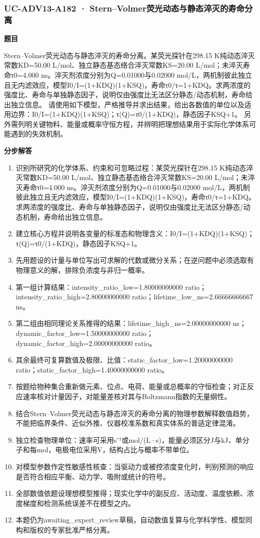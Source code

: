 \documentclass[UTF8,11pt,a4paper]{ctexart}
\begin{document}
\subsubsection*{UC-ADV13-A182 · Stern–Volmer荧光动态与静态淬灭的寿命分离}
\noindent\textbf{题目}\par
Stern–Volmer荧光动态与静态淬灭的寿命分离。某荧光探针在298.15 K纯动态淬灭常数KD=50.00 L/mol、独立静态基态络合淬灭常数KS=20.00 L/mol；未淬灭寿命τ0=4.000 ns。淬灭剂浓度分别为Q=0.01000与0.02000 mol/L，两机制彼此独立且无内滤效应，模型I0/I=(1+KDQ)(1+KSQ)，寿命τ0/τ=1+KDQ。求两浓度的强度比、寿命与单独静态因子，说明仅由强度比无法区分静态/动态机制，寿命给出独立信息。 请使用如下模型，严格推导并求出结果，给出各数值的单位以及适用边界：I0/I=(1+KDQ)(1+KSQ)；τ(Q)=τ0/(1+KDQ)，静态因子KSQ+1。 另外需列明关键物料、能量或概率守恒方程，并辨明把理想结果用于实际化学体系可能遇到的失效机制。\par
\medskip\noindent\textbf{分步解答}
\begin{enumerate}
\item 识别所研究的化学体系、约束和可忽略过程：某荧光探针在298.15 K纯动态淬灭常数KD=50.00 L/mol、独立静态基态络合淬灭常数KS=20.00 L/mol；未淬灭寿命τ0=4.000 ns。淬灭剂浓度分别为Q=0.01000与0.02000 mol/L，两机制彼此独立且无内滤效应，模型I0/I=(1+KDQ)(1+KSQ)，寿命τ0/τ=1+KDQ。求两浓度的强度比、寿命与单独静态因子，说明仅由强度比无法区分静态/动态机制，寿命给出独立信息。
\item 建立核心方程并说明各变量的标准态和物理含义：I0/I=(1+KDQ)(1+KSQ)；τ(Q)=τ0/(1+KDQ)，静态因子KSQ+1。
\item 先用题设的计量与单位写出可求解的代数或微分关系；在逆问题中必须选取有物理意义的解，排除负浓度与非归一概率。
\item 第一组计算结果：intensity\_ratio\_low=1.80000000000 ratio；intensity\_ratio\_high=2.80000000000 ratio；lifetime\_low\_ns=2.66666666667 ns。
\item 第二组由相同理论关系推得的结果：lifetime\_high\_ns=2.00000000000 ns；dynamic\_factor\_low=1.50000000000 ratio；dynamic\_factor\_high=2.00000000000 ratio。
\item 其余最终可复算数值及极限、比值：static\_factor\_low=1.20000000000 ratio；static\_factor\_high=1.40000000000 ratio。
\item 按题给物种集合重新做元素、位点、电荷、能量或总概率的守恒检查；对正反应速率核对计量因子，对能量差核对其与Boltzmann指数的无量纲性。
\item 结合Stern–Volmer荧光动态与静态淬灭的寿命分离的物理参数解释数值趋势，不能把临界条件、近似外推、仪器校准系数和真实体系的普适定律混淆。
\item 独立检查物理单位：速率可采用s⁻¹或mol/(L·s)，能量必须区分J与kJ、单分子和每mol，电极电位采用V，结构占比与概率不带单位。
\item 对模型参数作定性敏感性核查：当驱动力或被控浓度变化时，判别预测的响应是否符合相应平衡、动力学、吸附或统计的符号。
\item 全部数值依题设理想模型推得；现实化学中的副反应、活动度、温度依赖、浓度梯度和检测系统误差不在模型之内。
\item 本题仍为awaiting\_expert\_review草稿，自动数值复算与化学科学性、模型同构和版权的专家批准严格分离。
\end{enumerate}
\end{document}
